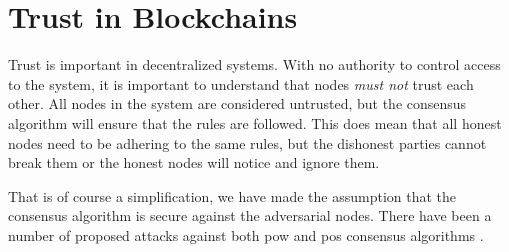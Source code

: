 \section{Trust in Blockchains}
\label{ch:blockchain:trust}

Trust is important in decentralized systems. With no authority to control access to the system, it is important to understand that nodes \emph{must not} trust each other. All nodes in the system are considered untrusted, but the consensus algorithm will ensure that the rules are followed. This does mean that all honest nodes need to be adhering to the same rules, but the dishonest parties cannot break them or the honest nodes will notice and ignore them.


That is of course a simplification, we have made the assumption that the consensus algorithm is secure against the adversarial nodes. There have been a number of proposed attacks against both \gls{pow} and \gls{pos} consensus algorithms .
